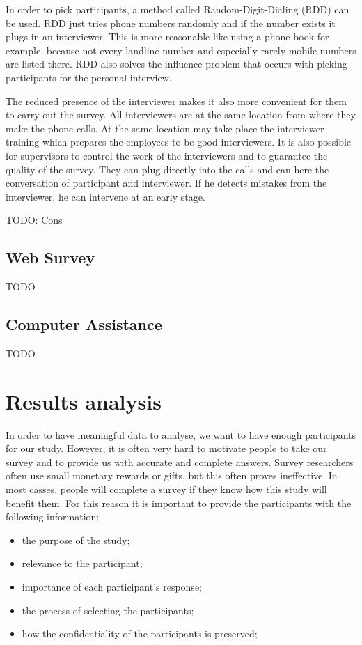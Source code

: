 \documentclass{report}
\begin{document}
In order to pick participants, a method called Random-Digit-Dialing (RDD) can be used. RDD just tries phone numbers randomly and if the number exists it plugs in an interviewer. This is more reasonable like using a phone book for example, because not every landline number and especially rarely mobile numbers are listed there. RDD also solves the influence problem that occurs with picking participants for the personal interview.

The reduced presence of the interviewer makes it also more convenient for them to carry out the survey. All interviewers are at the same location from where they make the phone calls. At the same location may take place the interviewer training which prepares the employees to be good interviewers. It is also possible for supervisors to control the work of the interviewers and to guarantee the quality of the survey. They can plug directly into the calls and can here the conversation of participant and interviewer. If he detects mistakes from the interviewer, he can intervene at an early stage.

TODO: Cons

\section{Web Survey}

TODO

\section{Computer Assistance}

TODO

\chapter{Results analysis}
In order to have meaningful data to analyse, we want to have enough participants for our study. However, it is often very hard to motivate people to take our survey and to provide us with accurate and complete answers. Survey researchers often use small monetary rewards or gifts, but this often proves ineffective. In most casses, people will complete a survey if they know how this study will benefit them. For this reason it is important to provide the participants with the following information\cite{Kitchenham4}:
\begin{itemize}
\item the purpose of the study;\\
\item relevance to the participant;\\
\item importance of each participant's response;\\
\item the process of selecting the participants;\\
\item how the confidentiality of the participants is preserved;\\
\end{itemize}
\end{document}
